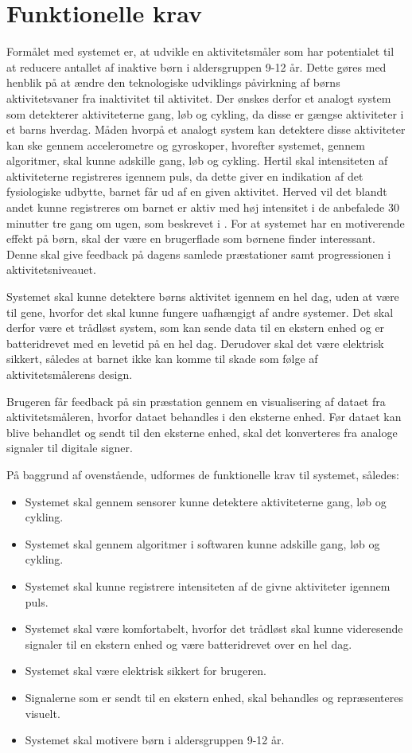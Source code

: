 \section{Funktionelle krav}
Formålet med systemet er, at udvikle en aktivitetsmåler som har potentialet til at reducere antallet af inaktive børn i aldersgruppen 9-12 år. Dette gøres med henblik på at ændre den teknologiske udviklings påvirkning af børns aktivitetsvaner fra inaktivitet til aktivitet.
Der ønskes derfor et analogt system som detekterer aktiviteterne gang, løb og cykling, da disse er gængse aktiviteter i et barns hverdag. Måden hvorpå et analogt system kan detektere disse aktiviteter kan ske gennem accelerometre og gyroskoper, hvorefter systemet, gennem algoritmer, skal kunne adskille gang, løb og cykling.
Hertil skal intensiteten af aktiviteterne registreres igennem puls, da dette giver en indikation af det fysiologiske udbytte, barnet får ud af en given aktivitet. Herved vil det blandt andet kunne registreres om barnet er aktiv med høj intensitet i de anbefalede 30 minutter tre gang om ugen, som beskrevet i . \newline
For at systemet har en motiverende effekt på børn, skal der være en brugerflade som børnene finder interessant. Denne skal give feedback på dagens samlede præstationer samt progressionen i aktivitetsniveauet.

Systemet skal kunne detektere børns aktivitet igennem en hel dag, uden at være til gene, hvorfor det skal kunne fungere uafhængigt af andre systemer. Det skal derfor være et trådløst system, som kan sende data til en ekstern enhed og er batteridrevet med en levetid på en hel dag. Derudover skal det være elektrisk sikkert, således at barnet ikke kan komme til skade som følge af aktivitetsmålerens design. 

Brugeren får feedback på sin præstation gennem en visualisering af dataet fra aktivitetsmåleren, hvorfor dataet behandles i den eksterne enhed. \newline
Før dataet kan blive behandlet og sendt til den eksterne enhed, skal det konverteres fra analoge signaler til digitale signer. 

På baggrund af ovenstående, udformes de funktionelle krav til systemet, således: 
\begin{itemize}
	\item Systemet skal gennem sensorer kunne detektere aktiviteterne gang, løb og cykling.
	\item Systemet skal gennem algoritmer i softwaren kunne adskille gang, løb og cykling.
	\item Systemet skal kunne registrere intensiteten af de givne aktiviteter igennem puls.
	\item Systemet skal være komfortabelt, hvorfor det trådløst skal kunne videresende signaler til en ekstern enhed og være batteridrevet over en hel dag.
	\item Systemet skal være elektrisk sikkert for brugeren.
	\item Signalerne som er sendt til en ekstern enhed, skal behandles og repræsenteres visuelt.
	\item Systemet skal motivere børn i aldersgruppen 9-12 år. 
\end{itemize}
